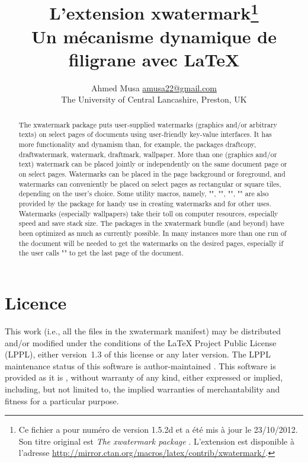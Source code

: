 \documentclass[a4paper]{ltxdoc}
\newcommand{\pkg}[1]{\textsf{#1}}
\newcommand{\ie}{i.e.}
\begin{document}
\title{L'extension \textsf{xwatermark}\thanks{Ce fichier a pour numéro de
        version 1.5.2d et a été mis à jour le 23/10/2012. Son 
        titre original est \og \emph{The \textsf{xwatermark} package} \fg.
        L'extension est disponible à l'adresse 
        \url{http://mirror.ctan.org/macros/latex/contrib/xwatermark/}.}
        \\ Un mécanisme dynamique de filigrane avec \LaTeX}
\author{Ahmed Musa \url{amusa22@gmail.com}\\
        {\small The University of Central Lancashire, Preston, UK}}

\maketitle

\tradini
\begin{abstract}
  The \pkg{xwatermark} package puts user-supplied watermarks (graphics and/or arbitrary texts) on select pages of documents using user-friendly key-value interfaces. It has more functionality and dynamism than, for example, the packages \pkg{draftcopy, draftwatermark, watermark, draftmark, wallpaper}. More than one (graphics and/or text) watermark can be placed jointly or independently on the same document page or on select pages. Watermarks can be placed in the page background or foreground, and watermarks can conveniently be placed on select pages as rectangular or square tiles, depending on the user's choice. Some utility macros, namely, "\xwmminipage", "\xwmcolorbox", "\makecolobox", "\fancypagenos" are also provided by the package for handy use in creating watermarks and for other uses. Watermarks (especially wallpapers) take their toll on computer resources, especially speed and save stack size. The packages in the \pkg{xwatermark} bundle (and beyond) have been optimized as much as currently possible. In many instances more than one run of the document will be needed to get the watermarks on the desired pages, especially if the user calls "\lastdocpage" to get the last page of the document.
\end{abstract}

\noindent

\section*{Licence}
  This work (\ie, all the files in the \pkg{xwatermark} manifest) may be distributed and/or
  modified under the conditions of the \LaTeX{} Project Public License (LPPL), either version~1.3 of 
  this license or any later version. The LPPL maintenance status of this software is 
  \og author-maintained \fg. This software is provided \og as it is \fg, without warranty of 
  any kind, either expressed or implied, including, but not limited to, the implied warranties 
  of merchantability and fitness for a particular purpose. %
\end{document}
